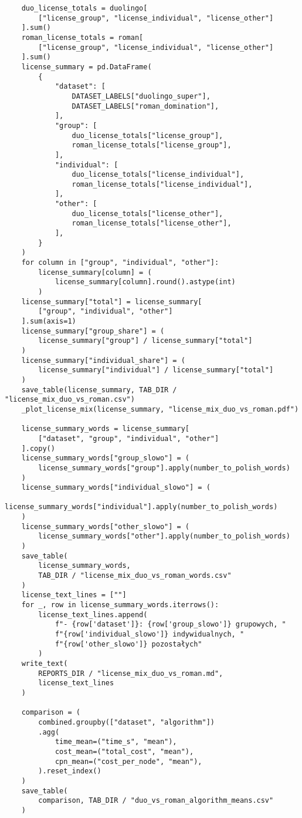 {\begin{verbatim}
    duo_license_totals = duolingo[
        ["license_group", "license_individual", "license_other"]
    ].sum()
    roman_license_totals = roman[
        ["license_group", "license_individual", "license_other"]
    ].sum()
    license_summary = pd.DataFrame(
        {
            "dataset": [
                DATASET_LABELS["duolingo_super"],
                DATASET_LABELS["roman_domination"],
            ],
            "group": [
                duo_license_totals["license_group"],
                roman_license_totals["license_group"],
            ],
            "individual": [
                duo_license_totals["license_individual"],
                roman_license_totals["license_individual"],
            ],
            "other": [
                duo_license_totals["license_other"],
                roman_license_totals["license_other"],
            ],
        }
    )
    for column in ["group", "individual", "other"]:
        license_summary[column] = (
            license_summary[column].round().astype(int)
        )
    license_summary["total"] = license_summary[
        ["group", "individual", "other"]
    ].sum(axis=1)
    license_summary["group_share"] = (
        license_summary["group"] / license_summary["total"]
    )
    license_summary["individual_share"] = (
        license_summary["individual"] / license_summary["total"]
    )
    save_table(license_summary, TAB_DIR / "license_mix_duo_vs_roman.csv")
    _plot_license_mix(license_summary, "license_mix_duo_vs_roman.pdf")

    license_summary_words = license_summary[
        ["dataset", "group", "individual", "other"]
    ].copy()
    license_summary_words["group_slowo"] = (
        license_summary_words["group"].apply(number_to_polish_words)
    )
    license_summary_words["individual_slowo"] = (
        license_summary_words["individual"].apply(number_to_polish_words)
    )
    license_summary_words["other_slowo"] = (
        license_summary_words["other"].apply(number_to_polish_words)
    )
    save_table(
        license_summary_words,
        TAB_DIR / "license_mix_duo_vs_roman_words.csv"
    )
    license_text_lines = [""]
    for _, row in license_summary_words.iterrows():
        license_text_lines.append(
            f"- {row['dataset']}: {row['group_slowo']} grupowych, "
            f"{row['individual_slowo']} indywidualnych, "
            f"{row['other_slowo']} pozostałych"
        )
    write_text(
        REPORTS_DIR / "license_mix_duo_vs_roman.md",
        license_text_lines
    )

    comparison = (
        combined.groupby(["dataset", "algorithm"])
        .agg(
            time_mean=("time_s", "mean"),
            cost_mean=("total_cost", "mean"),
            cpn_mean=("cost_per_node", "mean"),
        ).reset_index()
    )
    save_table(
        comparison, TAB_DIR / "duo_vs_roman_algorithm_means.csv"
    )


\end{verbatim}}
